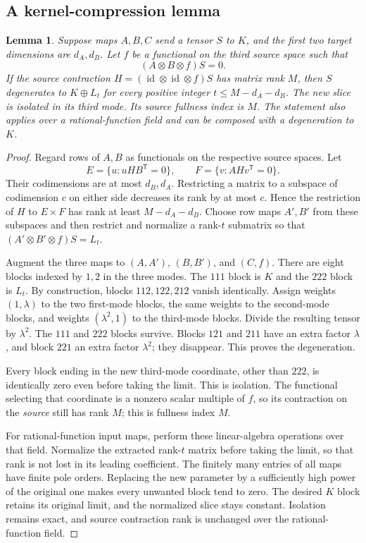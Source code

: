 \documentclass[11pt]{article}
\newcommand{\Id}{\operatorname{id}}
\newtheorem{lemma}[theorem]{Lemma}
\theoremstyle{definition}\newtheorem{definition}[theorem]{Definition}
\theoremstyle{remark}\newtheorem{remark}[theorem]{Remark}
\begin{document}
\subsection{A kernel-compression lemma}
\begin{lemma}\label{lem:extract}
Suppose maps $A,B,C$ send a tensor $S$ to $K$, and the first two target dimensions
are $d_A,d_B$. Let $f$ be a functional on the third source space such that
\[
(A\otimes B\otimes f)S=0.
\]
If the source contraction $H=(\Id\otimes\Id\otimes f)S$ has matrix rank $M$,
then $S$ degenerates to $K\oplus L_t$ for every positive integer
$t\leq M-d_A-d_B$.
The new slice is isolated in its third mode. Its source fullness index is $M$.
The statement also applies over a rational-function field and can be composed
with a degeneration to $K$.
\end{lemma}
\begin{proof}
Regard rows of $A,B$ as functionals on the respective source spaces. Let
\[
E=\{u:uHB^\mathsf T=0\},\qquad
F=\{v:AHv^\mathsf T=0\}.
\]
Their codimensions are at most $d_B,d_A$. Restricting a matrix to a subspace of
codimension $c$ on either side decreases its rank by at most $c$. Hence the
restriction of $H$ to $E\times F$ has rank at least $M-d_A-d_B$.
Choose row maps $A',B'$ from these subspaces and then restrict and normalize a
rank-$t$ submatrix so that
$(A'\otimes B'\otimes f)S=L_t$.

Augment the three maps to $(A,A')$, $(B,B')$, and $(C,f)$. There are eight
blocks indexed by $1,2$ in the three modes. The $111$ block is $K$ and the
$222$ block is $L_t$. By construction, blocks $112,122,212$ vanish identically.
Assign weights $(1,\lambda)$ to the two first-mode blocks, the same weights
to the second-mode blocks, and weights $(\lambda^2,1)$ to the third-mode
blocks. Divide the resulting tensor by $\lambda^2$.
The $111$ and $222$ blocks survive. Blocks $121$ and $211$ have an extra factor
$\lambda$, and block $221$ an extra factor $\lambda^2$; they disappear.
This proves the degeneration.

Every block ending in the new third-mode coordinate, other than $222$, is
identically zero even before taking the limit. This is isolation. The
functional selecting that coordinate is a nonzero scalar multiple of $f$, so
its contraction on the \emph{source} still has rank $M$; this is fullness index
$M$.

For rational-function input maps, perform these linear-algebra operations over
that field. Normalize the extracted rank-$t$ matrix before taking the limit,
so that rank is not lost in its leading coefficient. The finitely many entries
of all maps have finite pole orders. Replacing the new parameter by a
sufficiently high power of the original one makes every unwanted block tend
to zero. The desired $K$ block retains its original limit, and the normalized
slice stays constant. Isolation remains exact, and source contraction rank is
unchanged over the rational-function field.
\end{proof}
\end{document}
